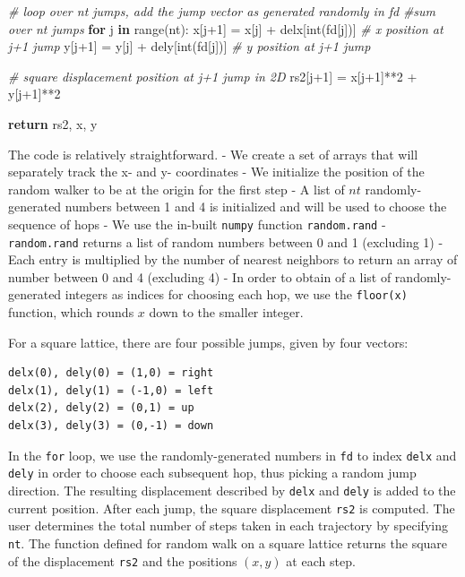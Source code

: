 \documentclass[11pt]{article}
\newenvironment{Shaded}{}{}
\newcommand{\KeywordTok}[1]{\textcolor[rgb]{0.00,0.44,0.13}{\textbf{{#1}}}}
\newcommand{\DecValTok}[1]{\textcolor[rgb]{0.25,0.63,0.44}{{#1}}}
\newcommand{\CommentTok}[1]{\textcolor[rgb]{0.38,0.63,0.69}{\textit{{#1}}}}
\newcommand{\NormalTok}[1]{{#1}}
\newcommand{\ControlFlowTok}[1]{\textcolor[rgb]{0.00,0.44,0.13}{\textbf{{#1}}}}
\newcommand{\OperatorTok}[1]{\textcolor[rgb]{0.40,0.40,0.40}{{#1}}}
\newcommand{\BuiltInTok}[1]{{#1}}
\begin{document}
\begin{Shaded}
\begin{Highlighting}[]
    \CommentTok{\# loop over nt jumps, add the jump vector as generated randomly in fd}
    \CommentTok{\#sum over nt jumps}
    \ControlFlowTok{for}\NormalTok{ j }\KeywordTok{in} \BuiltInTok{range}\NormalTok{(nt):}
\NormalTok{        x[j}\OperatorTok{+}\DecValTok{1}\NormalTok{] }\OperatorTok{=}\NormalTok{ x[j] }\OperatorTok{+}\NormalTok{ delx[}\BuiltInTok{int}\NormalTok{(fd[j])] }\CommentTok{\# x position at j+1 jump}
\NormalTok{        y[j}\OperatorTok{+}\DecValTok{1}\NormalTok{] }\OperatorTok{=}\NormalTok{ y[j] }\OperatorTok{+}\NormalTok{ dely[}\BuiltInTok{int}\NormalTok{(fd[j])] }\CommentTok{\# y position at j+1 jump}

        \CommentTok{\# square displacement position at j+1 jump in 2D}
\NormalTok{        rs2[j}\OperatorTok{+}\DecValTok{1}\NormalTok{] }\OperatorTok{=}\NormalTok{ x[j}\OperatorTok{+}\DecValTok{1}\NormalTok{]}\OperatorTok{**}\DecValTok{2} \OperatorTok{+}\NormalTok{ y[j}\OperatorTok{+}\DecValTok{1}\NormalTok{]}\OperatorTok{**}\DecValTok{2} 

    \ControlFlowTok{return}\NormalTok{ rs2, x, y}
\end{Highlighting}
\end{Shaded}

    The code is relatively straightforward. - We create a set of arrays that
will separately track the x- and y- coordinates - We initialize the
position of the random walker to be at the origin for the first step - A
list of $nt$ randomly-generated numbers between 1 and 4 is initialized
and will be used to choose the sequence of hops - We use the in-built
\texttt{numpy} function \texttt{random.rand} - \texttt{random.rand}
returns a list of random numbers between 0 and 1 (excluding 1) - Each
entry is multiplied by the number of nearest neighbors to return an
array of number between 0 and 4 (excluding 4) - In order to obtain of a
list of randomly-generated integers as indices for choosing each hop, we
use the \texttt{floor(x)} function, which rounds $x$ down to the
smaller integer.

For a square lattice, there are four possible jumps, given by four
vectors:

\begin{verbatim}
delx(0), dely(0) = (1,0) = right
delx(1), dely(1) = (-1,0) = left
delx(2), dely(2) = (0,1) = up
delx(3), dely(3) = (0,-1) = down
\end{verbatim}

In the \texttt{for} loop, we use the randomly-generated numbers in
\texttt{fd} to index \texttt{delx} and \texttt{dely} in order to choose
each subsequent hop, thus picking a random jump direction. The resulting
displacement described by \texttt{delx} and \texttt{dely} is added to
the current position. After each jump, the square displacement
\texttt{rs2} is computed. The user determines the total number of steps
taken in each trajectory by specifying \texttt{nt}. The function defined
for random walk on a square lattice returns the square of the
displacement \texttt{rs2} and the positions $(x,y)$ at each step.
\end{document}
